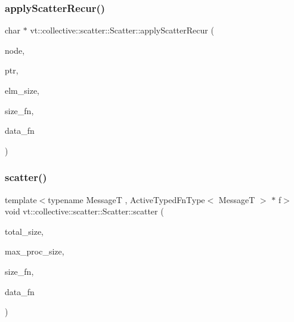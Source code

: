 \subsubsection{\texorpdfstring{apply\+Scatter\+Recur()}{applyScatterRecur()}}
{\footnotesize\ttfamily char $\ast$ vt\+::collective\+::scatter\+::\+Scatter\+::apply\+Scatter\+Recur (\begin{DoxyParamCaption}\item[{\hyperlink{namespacevt_a866da9d0efc19c0a1ce79e9e492f47e2}{Node\+Type}}]{node,  }\item[{char $\ast$}]{ptr,  }\item[{std\+::size\+\_\+t}]{elm\+\_\+size,  }\item[{\hyperlink{structvt_1_1collective_1_1scatter_1_1_scatter_a977d895e42999a4078c6705ac851f447}{Func\+Size\+Type}}]{size\+\_\+fn,  }\item[{\hyperlink{structvt_1_1collective_1_1scatter_1_1_scatter_a4040244e8ed36afd5d408c27efceea1b}{Func\+Data\+Type}}]{data\+\_\+fn }\end{DoxyParamCaption})\hspace{0.3cm}{\ttfamily [private]}}

\mbox{\label{structvt_1_1collective_1_1scatter_1_1_scatter_a0873f5fd4b890ad95e6ed6c097efe8bd}} 
\subsubsection{\texorpdfstring{scatter()}{scatter()}}
{\footnotesize\ttfamily template$<$typename MessageT , Active\+Typed\+Fn\+Type$<$ Message\+T $>$ $\ast$ f$>$ \\
void vt\+::collective\+::scatter\+::\+Scatter\+::scatter (\begin{DoxyParamCaption}\item[{std\+::size\+\_\+t const \&}]{total\+\_\+size,  }\item[{std\+::size\+\_\+t const \&}]{max\+\_\+proc\+\_\+size,  }\item[{\hyperlink{structvt_1_1collective_1_1scatter_1_1_scatter_a977d895e42999a4078c6705ac851f447}{Func\+Size\+Type}}]{size\+\_\+fn,  }\item[{\hyperlink{structvt_1_1collective_1_1scatter_1_1_scatter_a4040244e8ed36afd5d408c27efceea1b}{Func\+Data\+Type}}]{data\+\_\+fn }\end{DoxyParamCaption})}



